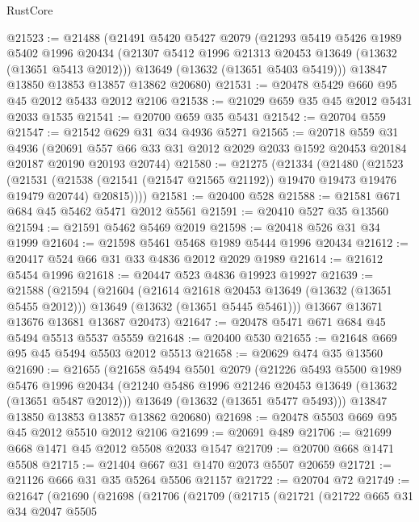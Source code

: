 \begin{lexlean}{RustCore}
\begin{coremodule}
@21523 := @21488
    (@21491
      @5420
      @5427
      @2079
      (@21293
        @5419
        @5426
        @1989
        @5402
        @1996
        @20434
        (@21307 @5412 @1996 @21313 @20453 @13649 (@13632 (@13651 @5413 @2012)))
        @13649
        (@13632 (@13651 @5403 @5419)))
      @13847
      @13850
      @13853
      @13857
      @13862
      @20680)
@21531 := @20478 @5429 @660 @95 @45 @2012 @5433 @2012 @2106
@21538 := @21029 @659 @35 @45 @2012 @5431 @2033 @1535
@21541 := @20700 @659 @35 @5431
@21542 := @20704 @559
@21547 := @21542 @629 @31 @34 @4936 @5271
@21565 := @20718
    @559
    @31
    @4936
    (@20691 @557 @66 @33 @31 @2012 @2029 @2033 @1592 @20453 @20184 @20187 @20190 @20193 @20744)
@21580 := @21275
    (@21334
      (@21480
        (@21523
          (@21531
            (@21538 (@21541 (@21547 @21565 @21192)) @19470 @19473 @19476 @19479 @20744)
            @20815))))
@21581 := @20400 @528
@21588 := @21581 @671 @684 @45 @5462 @5471 @2012 @5561
@21591 := @20410 @527 @35 @13560
@21594 := @21591 @5462 @5469 @2019
@21598 := @20418 @526 @31 @34 @1999
@21604 := @21598 @5461 @5468 @1989 @5444 @1996 @20434
@21612 := @20417 @524 @66 @31 @33 @4836 @2012 @2029 @1989
@21614 := @21612 @5454 @1996
@21618 := @20447 @523 @4836 @19923 @19927
@21639 := @21588
    (@21594
      (@21604
        (@21614 @21618 @20453 @13649 (@13632 (@13651 @5455 @2012)))
        @13649
        (@13632 (@13651 @5445 @5461)))
      @13667
      @13671
      @13676
      @13681
      @13687
      @20473)
@21647 := @20478 @5471 @671 @684 @45 @5494 @5513 @5537 @5559
@21648 := @20400 @530
@21655 := @21648 @669 @95 @45 @5494 @5503 @2012 @5513
@21658 := @20629 @474 @35 @13560
@21690 := @21655
    (@21658
      @5494
      @5501
      @2079
      (@21226
        @5493
        @5500
        @1989
        @5476
        @1996
        @20434
        (@21240 @5486 @1996 @21246 @20453 @13649 (@13632 (@13651 @5487 @2012)))
        @13649
        (@13632 (@13651 @5477 @5493)))
      @13847
      @13850
      @13853
      @13857
      @13862
      @20680)
@21698 := @20478 @5503 @669 @95 @45 @2012 @5510 @2012 @2106
@21699 := @20691 @489
@21706 := @21699 @668 @1471 @45 @2012 @5508 @2033 @1547
@21709 := @20700 @668 @1471 @5508
@21715 := @21404 @667 @31 @1470 @2073 @5507 @20659
@21721 := @21126 @666 @31 @35 @5264 @5506 @21157
@21722 := @20704 @72
@21749 := @21647
    (@21690
      (@21698
        (@21706
          (@21709
            (@21715
              (@21721
                (@21722
                  @665
                  @31
                  @34
                  @2047
                  @5505

\end{coremodule}
\end{lexlean}
